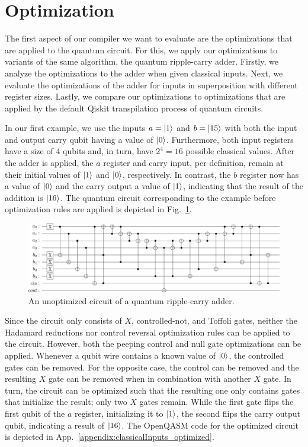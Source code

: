 \section{Optimization}
\label{sec:eval_optimization}
The first aspect of our compiler we want to evaluate are the optimizations that are applied to the quantum circuit. For this, we apply our optimizations to variants of the same algorithm, the quantum ripple-carry adder. Firstly, we analyze the optimizations to the adder when given classical inputs. Next, we evaluate the optimizations of the adder for inputs in superposition with different register sizes. Lastly, we compare our optimizations to optimizations that are applied by the default Qiskit transpilation process of quantum circuits.

In our first example, we use the inputs $a = \ket{1}$ and $b = \ket{15}$ with both the input and output carry qubit having a value of $\ket{0}$. Furthermore, both input registers have a size of 4 qubits and, in turn, have $2^4 = 16$ possible classical values. After the adder is applied, the $a$ register and carry input, per definition, remain at their initial values of $\ket{1}$ and $\ket{0}$, respectively. In contrast, the $b$ register now has a value of $\ket{0}$ and the carry output a value of $\ket{1}$, indicating that the result of the addition is $\ket{16}$. 
The quantum circuit corresponding to the example before optimization rules are applied is depicted in Fig.~\ref{fig:eval_adder_circuit}.
\begin{figure}[htp]
    \centering     
    \includegraphics[width=\textwidth]{../figures/images/adderCircuit.png}
    \caption{An unoptimized circuit of a quantum ripple-carry adder.}
    \label{fig:eval_adder_circuit}
\end{figure}

Since the circuit only consists of $X$, controlled-not, and Toffoli gates, neither the Hadamard reductions nor control reversal optimization rules can be applied to the circuit. However, both the peeping control and null gate optimizations can be applied. Whenever a qubit wire contains a known value of $\ket{0}$,  the controlled gates can be removed. For the opposite case, the control can be removed and the resulting $X$ gate can be removed when in combination with another $X$ gate. In turn, the circuit can be optimized such that the resulting one only contains gates that initialize the result; only two $X$ gates remain. While the first gate flips the first qubit of the $a$ register, initializing it to $\ket{1}$, the second flips the carry output qubit, indicating a result of $\ket{16}$. The OpenQASM code for the optimized circuit is depicted in App.~\ref{appendix:classicalInputs_optimized}.

